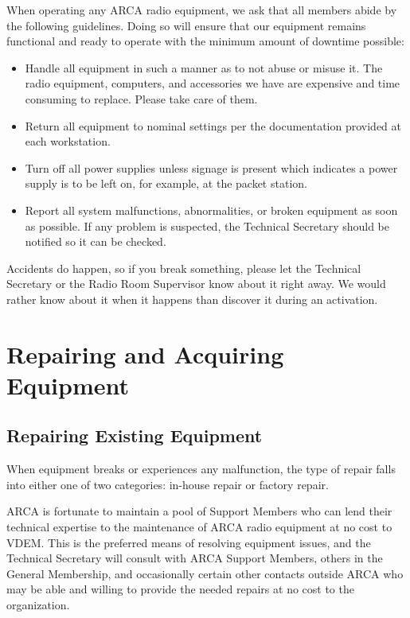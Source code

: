 \documentclass[pdflatex,letterpaper,twoside,12pt]{book}
\begin{document}
When operating any ARCA radio equipment, we ask that all members abide by the following guidelines.  Doing so will ensure that our equipment remains functional and ready to operate with the minimum amount of downtime possible:

\begin{itemize}
	\item Handle all equipment in such a manner as to not abuse or misuse it.  The radio equipment, computers, and accessories we have are expensive and time consuming to replace.  Please take care of them.
	\item Return all equipment to nominal settings per the documentation provided at each workstation.
	\item Turn off all power supplies unless signage is present which indicates a power supply is to be left on, for example, at the packet station.
	\item Report all system malfunctions, abnormalities, or broken equipment as soon as possible.  If any problem is suspected, the Technical Secretary should be notified so it can be checked.
\end{itemize}

Accidents do happen, so if you break something, please let the Technical Secretary or the Radio Room Supervisor know about it right away.  We would rather know about it when it happens than discover it during an activation.

\section{Repairing and Acquiring Equipment}

\subsection{Repairing Existing Equipment}

When equipment breaks or experiences any malfunction, the type of repair falls into either one of two categories:  in-house repair or factory repair.

ARCA is fortunate to maintain a pool of Support Members who can lend their technical expertise to the maintenance of ARCA radio equipment at no cost to VDEM.  This is the preferred means of resolving equipment issues, and the Technical Secretary will consult with ARCA Support Members, others in the General Membership, and occasionally certain other contacts outside ARCA who may be able and willing to provide the needed repairs at no cost to the organization.
\end{document}
